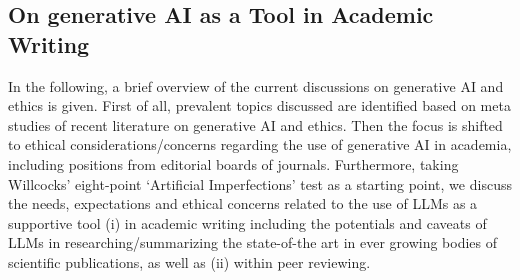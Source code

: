 \subsection{On generative AI as a Tool in Academic Writing}  

In the following, a brief overview of the current discussions on generative AI and ethics is given. First of all, prevalent topics discussed are identified based on meta studies of recent literature on generative AI and ethics. Then the focus is shifted to ethical considerations/concerns regarding the use of generative AI in academia, including positions from editorial boards of journals. 
Furthermore, taking Willcocks’ eight-point ‘Artificial Imperfections’ test as a starting point, we discuss the needs, expectations and ethical concerns related to the use of LLMs as a supportive tool (i) in academic writing including the potentials and caveats of LLMs in  researching/summarizing the state-of-the art in ever growing bodies of scientific publications, as well as (ii) within peer reviewing.

